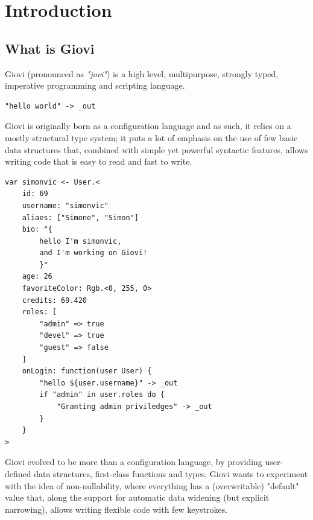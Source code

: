 \chapter{Introduction}

\section{What is Giovi}

Giovi (pronounced as \textit{"jovi"}) is a high level, multipurpose,
strongly typed, imperative programming and scripting language.

\begin{listing}
	\label{lst:hello_world}
	\begin{verbatim}
"hello world" -> _out
	\end{verbatim}
	\caption{The usual sample program that prints "hello world" to stdout}
\end{listing}

Giovi is originally born as a configuration language and as such, it relies on
a mostly structural type system; it puts a lot of emphasis on the use of few
basic data structures that, combined with simple yet powerful syntactic
features, allows writing code that is easy to read and fast to write.

\begin{listing}
	\label{lst:intro_overview}
	\caption[Syntax intro overview]{
		A variable declaration of type , initialized with a variety
		of data types: primitive types (numbers, strings, boolean), collection
		types (lists, maps), product types and functions
	}
	\begin{verbatim}
var simonvic <- User.<
	id: 69
	username: "simonvic"
	aliaes: ["Simone", "Simon"]
	bio: "{
		hello I'm simonvic,
		and I'm working on Giovi!
		}"
	age: 26
	favoriteColor: Rgb.<0, 255, 0>
	credits: 69.420
	roles: [
		"admin" => true
		"devel" => true
		"guest" => false
	]
	onLogin: function(user User) {
		"hello ${user.username}" -> _out
		if "admin" in user.roles do {
			"Granting admin priviledges" -> _out
		}
	}
>
	\end{verbatim}
\end{listing}

Giovi evolved to be more than a configuration language, by providing
user-defined data structures, first-class functions and types. Giovi wants to
experiment with the idea of non-nullability, where everything has a
(overwritable) "default" value that, along the support for automatic data
widening (but explicit narrowing), allows writing flexible code with few
keystrokes.


